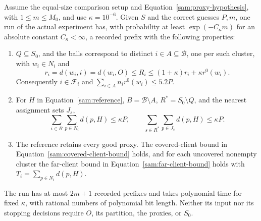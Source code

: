 \begin{theorem}\label{sam:successful-prefix}
Assume the equal-size comparison setup and
Equation~\eqref{sam:proxy-hypothesis}, with $1\le m\le M_0$, and use
$\kappa=10^{-6}$.  Given $S$ and the correct guesses $P,m$, one run of the
actual experiment has, with probability at least $\exp(-C_\kappa m)$ for
an absolute constant $C_\kappa<\infty$, a recorded prefix with the
following properties:
\begin{enumerate}[label=\textup{(\roman*)}]
\item $Q\subseteq S_0$, and the balls correspond to distinct
      $i\in A\subseteq\mathcal B$, one per such cluster, with
      $w_i\in N_i$ and
      \[
       r_i=d(w_i,i)=d(w_i,O)\le R_i
       \le(1+\kappa)r_i+\kappa r^0(w_i).
      \]
      Consequently $i\in\mathcal F_i$ and
      $\sum_{i\in A}n_i r^0(w_i)\le5.2P$.
\item For $H$ in Equation~\eqref{sam:reference}, $B=\mathcal B\setminus A$,
      $R^*=S_0\setminus Q$, and the nearest assignment sets $J_s$,
      \[
       \sum_{i\in B}\sum_{p\in N_i}d(p,H)\le\kappa P,
       \qquad
       \sum_{s\in R^*}\sum_{p\in J_s}d(p,H)\le\kappa P.
      \]
\item The reference retains every good proxy.  The covered-client bound
      in Equation~\eqref{sam:covered-client-bound} holds, and for each
      uncovered nonempty cluster the far-client bound in
      Equation~\eqref{sam:far-client-bound} holds with
      $T_i=\sum_{p\in N_i}d(p,H)$.
\end{enumerate}
The run has at most $2m+1$ recorded prefixes and takes polynomial time
for fixed $\kappa$, with rational numbers of polynomial bit length.
Neither its input nor its stopping decisions require $O$, its partition,
the proxies, or $S_0$.
\end{theorem}

